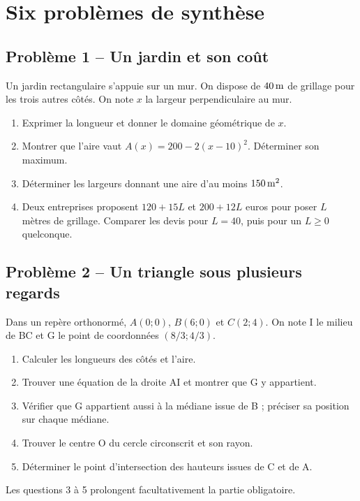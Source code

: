 \chapter{Six problèmes de synthèse}
\section*{Problème 1 -- Un jardin et son coût}
Un jardin rectangulaire s'appuie sur un mur. On dispose de $40\,\mathrm{m}$ de grillage pour les trois autres côtés. On note $x$ la largeur perpendiculaire au mur.
\begin{enumerate}
\item Exprimer la longueur et donner le domaine géométrique de $x$.
\item Montrer que l'aire vaut $A(x)=200-2(x-10)^2$. Déterminer son maximum.
\item Déterminer les largeurs donnant une aire d'au moins $150\,\mathrm{m^2}$.
\item Deux entreprises proposent $120+15L$ et $200+12L$ euros pour poser $L$ mètres de grillage. Comparer les devis pour $L=40$, puis pour un $L\ge0$ quelconque.
\end{enumerate}

\section*{Problème 2 -- Un triangle sous plusieurs regards}
Dans un repère orthonormé, $A(0;0)$, $B(6;0)$ et $C(2;4)$. On note I le milieu de BC et G le point de coordonnées $(8/3;4/3)$.
\begin{enumerate}
\item Calculer les longueurs des côtés et l'aire.
\item Trouver une équation de la droite AI et montrer que G y appartient.
\item Vérifier que G appartient aussi à la médiane issue de B ; préciser sa position sur chaque médiane.
\item Trouver le centre O du cercle circonscrit et son rayon.
\item Déterminer le point d'intersection des hauteurs issues de C et de A.
\end{enumerate}
Les questions 3 à 5 prolongent facultativement la partie obligatoire.

